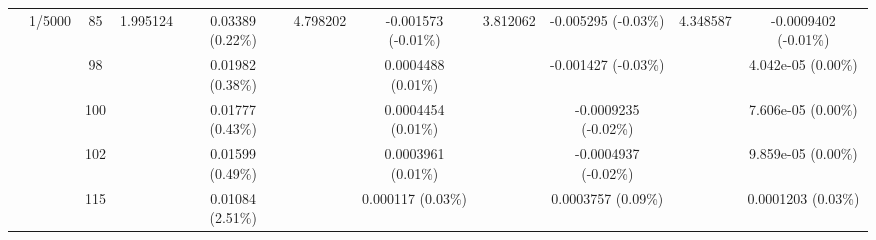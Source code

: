 \begin{table}[htbp]
{\begin{tabular}{llccccccccc}
& \multirow{5}{*}{1/5000} & 85 & \multirow{5}{*}{1.995124} & 0.03389 (0.22\%) & \multirow{5}{*}{4.798202} & -0.001573 (-0.01\%) & \multirow{5}{*}{3.812062} & -0.005295 (-0.03\%) & \multirow{5}{*}{4.348587} & -0.0009402 (-0.01\%) \\
& & 98 & & 0.01982 (0.38\%) & & 0.0004488 (0.01\%) & & -0.001427 (-0.03\%) & & 4.042e-05 (0.00\%) \\
& & 100 & & 0.01777 (0.43\%) & & 0.0004454 (0.01\%) & & -0.0009235 (-0.02\%) & & 7.606e-05 (0.00\%) \\
& & 102 & & 0.01599 (0.49\%) & & 0.0003961 (0.01\%) & & -0.0004937 (-0.02\%) & & 9.859e-05 (0.00\%) \\
& & 115 & & 0.01084 (2.51\%) & & 0.000117 (0.03\%) & & 0.0003757 (0.09\%) & & 0.0001203 (0.03\%) \\
\midrule


\end{tabular}}
\end{table}

